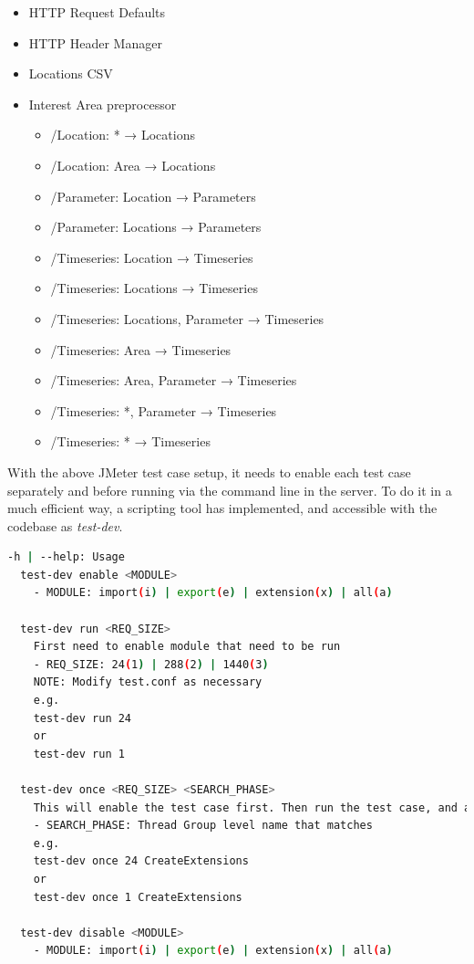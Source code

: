 \begin{itemize}
    \item HTTP Request Defaults
    \item HTTP Header Manager
    \item Locations CSV
    \item Interest Area preprocessor
    \begin{itemize}
        \item /Location: * → Locations
    	\item /Location: Area → Locations
    	\item /Parameter: Location → Parameters
    	\item /Parameter: Locations → Parameters
    	\item /Timeseries: Location → Timeseries
    	\item /Timeseries: Locations → Timeseries
    	\item /Timeseries: Locations, Parameter → Timeseries
    	\item /Timeseries: Area → Timeseries
    	\item /Timeseries: Area, Parameter → Timeseries
    	\item /Timeseries: *, Parameter → Timeseries
    	\item /Timeseries: * → Timeseries
	\end{itemize}
\end{itemize}


With the above  JMeter test case setup, it needs to enable each test case separately and before running via the command line in the server. To do it in a much efficient way, a scripting tool has implemented, and accessible with the codebase \cite{KarunarathneWdias-performance-test/TEST_PLAN.md:Plan} as \emph{test-dev}.

\begin{lstlisting}[language=sh, caption=Performance Test Help]
-h | --help: Usage
  test-dev enable <MODULE>
    - MODULE: import(i) | export(e) | extension(x) | all(a)

  test-dev run <REQ_SIZE>
    First need to enable module that need to be run
    - REQ_SIZE: 24(1) | 288(2) | 1440(3)
    NOTE: Modify test.conf as necessary
    e.g.
    test-dev run 24
    or
    test-dev run 1

  test-dev once <REQ_SIZE> <SEARCH_PHASE>
    This will enable the test case first. Then run the test case, and at the end disable and exit.
    - SEARCH_PHASE: Thread Group level name that matches
    e.g.
    test-dev once 24 CreateExtensions
    or
    test-dev once 1 CreateExtensions

  test-dev disable <MODULE>
    - MODULE: import(i) | export(e) | extension(x) | all(a)
\end{lstlisting}

